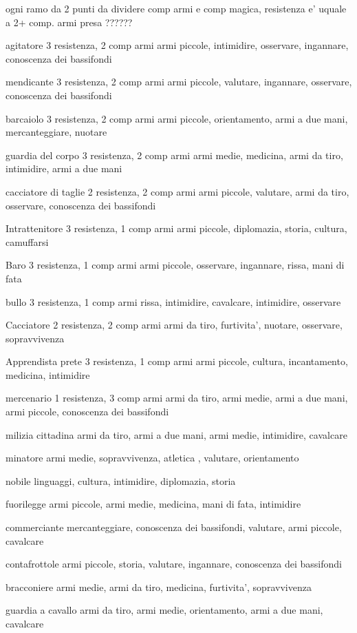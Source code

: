 \documentclass[12pt,a4paper,twoside,openany,twocolumn]{book}
\begin{document}
ogni ramo da 2 punti da dividere comp armi e comp magica, resistenza e' uquale a 2+ comp. armi presa ??????


agitatore  3 resistenza, 2 comp armi
armi piccole, intimidire, osservare, ingannare, conoscenza dei bassifondi

mendicante 3 resistenza, 2 comp armi
armi piccole, valutare, ingannare, osservare, conoscenza dei bassifondi

barcaiolo 3 resistenza, 2 comp armi
armi piccole, orientamento, armi a due mani,  mercanteggiare, nuotare

guardia del corpo 3 resistenza, 2 comp armi
armi medie, medicina, armi da tiro, intimidire, armi a due mani

cacciatore di taglie 2 resistenza, 2 comp armi
armi piccole, valutare, armi da tiro, osservare, conoscenza dei bassifondi

Intrattenitore 3 resistenza, 1 comp armi
armi piccole, diplomazia, storia, cultura, camuffarsi

Baro 3 resistenza, 1 comp armi
armi piccole, osservare, ingannare, rissa, mani di fata

bullo 3 resistenza, 1 comp armi
rissa, intimidire, cavalcare, intimidire,  osservare

Cacciatore 2 resistenza, 2 comp armi
armi da tiro, furtivita', nuotare,  osservare, sopravvivenza

Apprendista prete 3 resistenza, 1 comp armi
armi piccole, cultura, incantamento, medicina, intimidire

mercenario 1 resistenza, 3 comp armi
armi da tiro, armi medie, armi a due mani, armi piccole, conoscenza dei bassifondi

milizia cittadina  
armi da tiro, armi a due mani, armi medie, intimidire, cavalcare

minatore
armi medie, sopravvivenza, atletica , valutare, orientamento

nobile
linguaggi, cultura, intimidire,  diplomazia, storia

fuorilegge
armi piccole, armi medie, medicina, mani di fata, intimidire

commerciante
mercanteggiare, conoscenza dei bassifondi, valutare, armi piccole, cavalcare

contafrottole
armi piccole, storia, valutare, ingannare, conoscenza dei bassifondi

bracconiere
armi medie, armi da tiro, medicina, furtivita', sopravvivenza

guardia a cavallo
armi da tiro, armi medie, orientamento, armi a due mani, cavalcare
\end{document}
